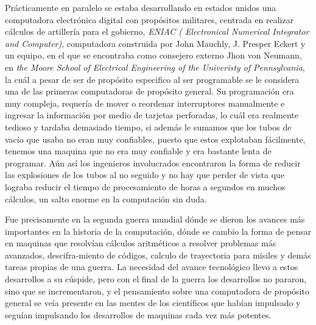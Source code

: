\documentclass[letterpaper,12pt,oneside]{book}
\begin{document}
		Prácticamente en paralelo se estaba desarrollando
		en estados unidos una computadora electrónica digital con propósitos militares, centrada en realizar cálculos de artillería para el gobierno,
		\textit{ENIAC ( Electronical Numerical Integrator and Computer)}, computadora construida por John Mauchly, J. Presper Eckert y un equipo, en
		el que se encontraba como consejero externo Jhon von Neumann, en
		\textit{the Moore School of Electrical Engineering of the Univeristy of Pennsylvania}, la cuál a pesar de ser de propósito especifico
		al ser programable se le considera una de las primeras computadoras de propósito general. Su programación era muy compleja, requería de mover o reordenar
		interruptores manualmente e ingresar la información por medio de tarjetas perforadas, 
		lo cuál era realmente tedioso y tardaba demasiado tiempo, si además le sumamos que  los tubos de vacío que usaba no eran muy confiables, puesto que estos explotaban 	
		fácilmente, tenemos una maquina que no era muy confiable y era bastante lenta de programar. Aún así los ingenieros involucrados encontraron la forma de reducir
		las explosiones de los tubos al no  seguido y no hay que perder de vista que lograba reducir el tiempo de procesamiento de horas a segundos en muchos 
		cálculos, un salto enorme en la computación sin duda\cite{ifrah_universal_2001}.
		
		
		Fue precisamente en la segunda guerra mundial dónde se dieron los avances más importantes en la historia de la computación, dónde se cambio la forma de
		pensar en maquinas que resolvían cálculos aritméticos a resolver problemas más avanzados, descifra-miento de códigos, calculo de trayectoria para
		misiles y demás tareas propias de una guerra. La necesidad del avance tecnológico llevo a estos desarrollos a su cúspide, pero con el final de
		la guerra los desarrollos no pararon, sino que se incrementaron, y el pensamiento sobre una computadora de propósito general se veía
		presente en las mentes de los científicos que habían impulsado y seguían impulsando los desarrollos de maquinas cada vez más potentes.
		
\end{document}
